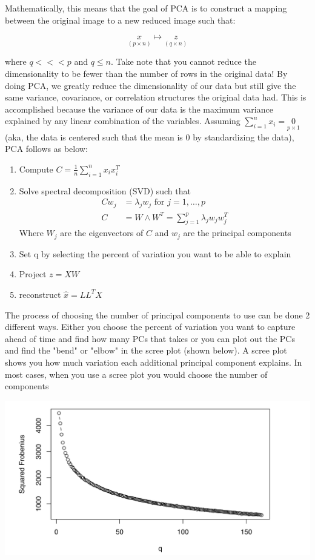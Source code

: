 \documentclass[a4paper]{article}
\begin{document}
Mathematically, this means that the goal of PCA is to construct a mapping between the original image to a new reduced image such that:

$$\underset{(p\times n)}{x} \mapsto \underset{(q\times n)}{z}$$

where $q<<<p$ and $q\leq n$. Take note that you cannot reduce the dimensionality to be fewer than the number of rows in the original data! By doing PCA, we greatly reduce the dimensionality of our data but still give the same variance, covariance, or correlation structures the original data had. This is accomplished because the variance of our data is the maximum variance explained by any linear combination of the variables. Assuming $\sum_{i=1}^{n}x_{i}=\underset{p\times 1}{0}$ (aka, the data is centered such that the mean is 0 by standardizing the data), PCA follows as below:

\begin{enumerate}
\item Compute $C=\frac{1}{n}\sum_{i=1}^{n}x_{i}x_{i}^{T}$
\item Solve spectral decomposition (SVD) such that \begin{align*}
Cw_{j} &= \lambda_{j}w_{j} \text{ for } j=1,\dots,p\\
C&= W\wedge W^{T}=\sum_{j=1}^{p}\lambda_{j}w_{j}w_{j}^{T}
\end{align*}
Where $W_{j}$ are the eigenvectors of $C$ and $w_{j}$ are the principal components
\item Set q by selecting the percent of variation you want to be able to explain
\item Project $z=XW$
\item reconstruct $\hat{x}=LL^{T}X$
\end{enumerate}

The process of choosing the number of principal components to use can be done 2 different ways. Either you choose the percent of variation you want to capture ahead of time and find how many PCs that takes or you can plot out the PCs and find the "bend" or "elbow" in the scree plot (shown below). A scree plot shows you how much variation each additional principal component explains. In most cases, when you use a scree plot you would choose the number of components 

\includegraphics[scale=.6]{scree.png}
\end{document}
